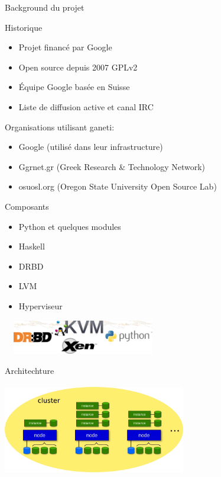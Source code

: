 \begin{frame}{Background du projet}
\begin{block}{Historique}
  \begin{itemize}
  \item Projet financé par Google
\pause
  \item Open source depuis 2007 GPLv2
\pause
  \item Équipe Google basée en Suisse
\pause
  \item Liste de diffusion active et canal IRC
\pause
  \end{itemize}
\end{block}
\begin{block}{Organisations utilisant ganeti:}
  \begin{itemize}
  \item Google (utilisé dans leur infrastructure)
\pause
  \item Ggrnet.gr (Greek Research \& Technology Network)
\pause
  \item osuosl.org (Oregon State University Open Source Lab)
  \end{itemize}
\end{block}
\end{frame}

\begin{frame}{Composants}
\begin{itemize}
\item Python et quelques modules
\pause
\item Haskell
\pause
\item DRBD
\pause
\item LVM
\pause
\item Hyperviseur
\end{itemize}
\begin{center}
  \includegraphics[width=7cm,height=1.5cm]{images_presentation/module.png}
\end{center}
\end{frame}

\begin{frame}{Architechture}
\begin{center}
  \includegraphics[width=8cm,height=4cm]{images_presentation/archi1.png}
\end{center}
\end{frame}


